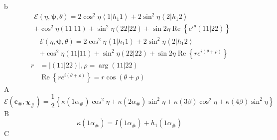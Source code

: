 \documentclass[aps,preprint]{revtex4}%
\begin{document}
b%
\begin{align*}
&  \mathcal{E}\left(  \eta,\mathbf{\psi,}\theta\right)  =2\cos^{2}%
\eta\left\langle 1\left\vert h_{1}1\right.  \right\rangle +2\sin^{2}%
\eta\left\langle 2\left\vert h_{1}2\right.  \right\rangle \\
&  +\cos^{2}\eta\left(  \left.  11\right\vert 11\right)  +\sin^{2}\eta\left(
\left.  22\right\vert 22\right)  +\sin2\eta\operatorname{Re}\left\{
e^{i\theta}\left(  \left.  11\right\vert 22\right)  \right\}
\end{align*}%
\begin{align*}
&  \mathcal{E}\left(  \eta,\mathbf{\psi,}\theta\right)  =2\cos^{2}%
\eta\left\langle 1\left\vert h_{1}1\right.  \right\rangle +2\sin^{2}%
\eta\left\langle 2\left\vert h_{1}2\right.  \right\rangle \\
&  +\cos^{2}\eta\left(  \left.  11\right\vert 11\right)  +\sin^{2}\eta\left(
\left.  22\right\vert 22\right)  +\sin2\eta\operatorname{Re}\left\{
re^{i\left(  \theta+\rho\right)  }\right\} \\
r  &  =\left\vert \left(  \left.  11\right\vert 22\right)  \right\vert
,\rho=\arg\left(  \left.  11\right\vert 22\right) \\
&  \operatorname{Re}\left\{  re^{i\left(  \theta+\rho\right)  }\right\}
=r\cos\left(  \theta+\rho\right)
\end{align*}
A%
\[
\mathcal{E}\left(  \mathbf{c}_{\#},\mathbf{\chi}_{\#}\right)  =\frac{1}%
{2}\left\{  \kappa\left(  1\alpha_{\#}\right)  \cos^{2}\eta+\kappa\left(
2\alpha_{\#}\right)  \sin^{2}\eta+\kappa\left(  3\beta\right)  \cos^{2}%
\eta+\kappa\left(  4\beta\right)  \sin^{2}\eta\right\}
\]
B%
\[
\kappa\left(  1\alpha_{\#}\right)  =I\left(  1\alpha_{\#}\right)
+h_{1}\left(  1\alpha_{\#}\right)
\]
C%
\end{document}
